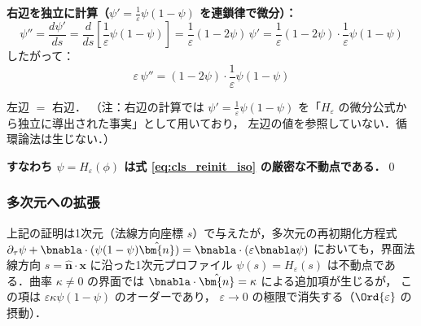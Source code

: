 \textbf{右辺を独立に計算（$\psi' = \tfrac{1}{\varepsilon}\psi(1-\psi)$ を連鎖律で微分）：}
\[
  \psi'' = \frac{d\psi'}{ds}
         = \frac{d}{ds}\!\left[\frac{1}{\varepsilon}\psi(1-\psi)\right]
         = \frac{1}{\varepsilon}(1-2\psi)\,\psi'
         = \frac{1}{\varepsilon}(1-2\psi)\cdot\frac{1}{\varepsilon}\psi(1-\psi)
\]
したがって：
\[
  \varepsilon\,\psi''
  = (1-2\psi)\cdot\frac{1}{\varepsilon}\psi(1-\psi)
\]

左辺 $=$ 右辺．
（注：右辺の計算では $\psi' = \tfrac{1}{\varepsilon}\psi(1-\psi)$ を「$H_\varepsilon$ の微分公式から独立に導出された事実」として用いており，
左辺の値を参照していない．循環論法は生じない．）

\textbf{すなわち $\psi = H_\varepsilon(\phi)$ は式 \eqref{eq:cls_reinit_iso} の厳密な不動点である．}\qed

\subsubsection*{多次元への拡張}

上記の証明は1次元（法線方向座標 $s$）で与えたが，多次元の再初期化方程式
$\partial_\tau\psi + \bnabla\cdot(\psi(1-\psi)\hat{\bm{n}}) = \bnabla\cdot(\varepsilon\bnabla\psi)$
においても，界面法線方向 $s = \hat{\bm{n}}\cdot\bm{x}$ に沿った1次元プロファイル
$\psi(s) = H_\varepsilon(s)$ は不動点である．曲率 $\kappa \neq 0$ の界面では
$\bnabla\cdot\hat{\bm{n}} = \kappa$ による追加項が生じるが，
この項は $\varepsilon\kappa\psi(1-\psi)$ のオーダーであり，
$\varepsilon \to 0$ の極限で消失する（$\Ord{\varepsilon}$ の摂動）．
